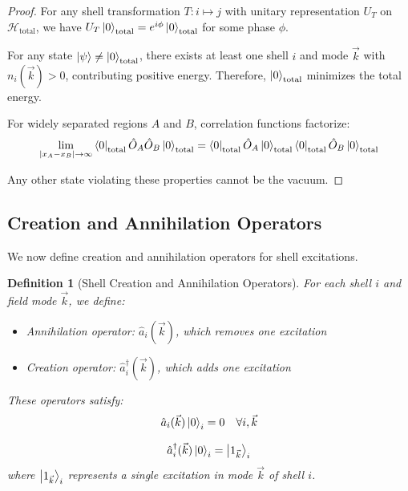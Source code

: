 \documentclass[12pt,a4paper]{article}
\newtheorem{definition}{Definition}[section]
\newcommand{\Hilbert}{\mathcal{H}}
\begin{document}
\begin{proof}
For any shell transformation $T: i \mapsto j$ with unitary representation $U_T$ on $\Hilbert_{\text{total}}$, we have $U_T\ket{0}_{\text{total}} = e^{i\phi}\ket{0}_{\text{total}}$ for some phase $\phi$.

For any state $\ket{\psi} \neq \ket{0}_{\text{total}}$, there exists at least one shell $i$ and mode $\vec{k}$ with $n_i(\vec{k}) > 0$, contributing positive energy. Therefore, $\ket{0}_{\text{total}}$ minimizes the total energy.

For widely separated regions $A$ and $B$, correlation functions factorize:
\begin{equation}
\lim_{|x_A-x_B| \to \infty} \bra{0}_{\text{total}} \hat{O}_A \hat{O}_B \ket{0}_{\text{total}} = \bra{0}_{\text{total}} \hat{O}_A \ket{0}_{\text{total}} \bra{0}_{\text{total}} \hat{O}_B \ket{0}_{\text{total}}
\end{equation}

Any other state violating these properties cannot be the vacuum.
\end{proof}

\subsection{Creation and Annihilation Operators}
\label{subsec:creation-annihilation}

We now define creation and annihilation operators for shell excitations.

\begin{definition}[Shell Creation and Annihilation Operators]
\label{def:creation-annihilation}
For each shell $i$ and field mode $\vec{k}$, we define:
\begin{itemize}
    \item Annihilation operator: $\hat{a}_i(\vec{k})$, which removes one excitation
    \item Creation operator: $\hat{a}_i^{\dagger}(\vec{k})$, which adds one excitation
\end{itemize}
These operators satisfy:
\begin{equation}
\hat{a}_i(\vec{k}) \ket{0}_i = 0 \quad \forall i, \vec{k}
\end{equation}

\begin{equation}
\hat{a}_i^{\dagger}(\vec{k}) \ket{0}_i = \ket{1_{\vec{k}}}_i
\end{equation}
where $\ket{1_{\vec{k}}}_i$ represents a single excitation in mode $\vec{k}$ of shell $i$.
\end{definition}
\end{document}
